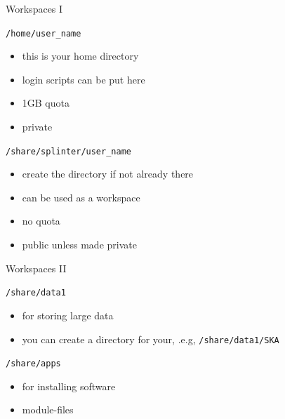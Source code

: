 \documentclass{beamer}
\begin{document}
\begin{frame}{Workspaces I}
	\begin{block}{\texttt{/home/user\_name}}
		\begin{itemize}
			\item this is your home directory
			\item login scripts can be put here
			\item 1GB quota
			\item private
		\end{itemize}
	\end{block}
	\begin{block}{\texttt{/share/splinter/user\_name}}
		\begin{itemize}
			\item create the directory if not already there
			\item can be used as a workspace
			\item no quota
			\item public unless made private
		\end{itemize}
	\end{block}
\end{frame}

\begin{frame}{Workspaces II}
	\begin{block}{\texttt{/share/data1}}
		\begin{itemize}
			\item for storing large data
			\item you can create a directory for your, .e.g, \texttt{/share/data1/SKA}
		\end{itemize}
	\end{block}

	\begin{block}{\texttt{/share/apps}}
		\begin{itemize}
			\item for installing software
			\item module-files
		\end{itemize}
	\end{block}
\end{frame}
\end{document}
